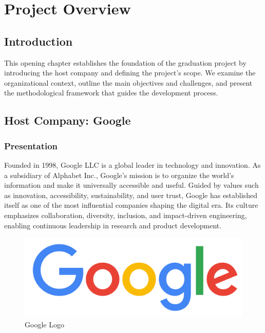 \setcounter{mtc}{5} %
\chapter{Project Overview}
\minitoc  %

\graphicspath{{Chapitre1/figures/}}
\pagestyle{fancy}
\fancyhf{}
\fancyfoot[R]{\thepage}
\renewcommand{\headrulewidth}{0.5pt}
\renewcommand{\footrulewidth}{0pt}

\begin{spacing}{1.2}

\section*{Introduction}
This opening chapter establishes the foundation of the graduation project by introducing the
host company and defining the project’s scope. We examine the organizational context,
outline the main objectives and challenges, and present the methodological framework that
guides the development process.


\section{Host Company: Google} 

\subsection{Presentation} 
Founded in 1998, Google LLC is a global leader in technology and innovation. As a subsidiary of Alphabet Inc., Google’s mission is to organize the world’s information and make it universally accessible and useful. Guided by values such as innovation, accessibility, sustainability, and user trust, Google has established itself as one of the most influential companies shaping the digital era. Its culture emphasizes collaboration, diversity, inclusion, and impact-driven engineering, enabling continuous leadership in research and product development.

\begin{figure}[!ht]\centering
\includegraphics[scale=0.07]{Images/google_logo.png}
\caption{Google Logo}
\label{fig:google_logo}
\end{figure}


\end{spacing}
